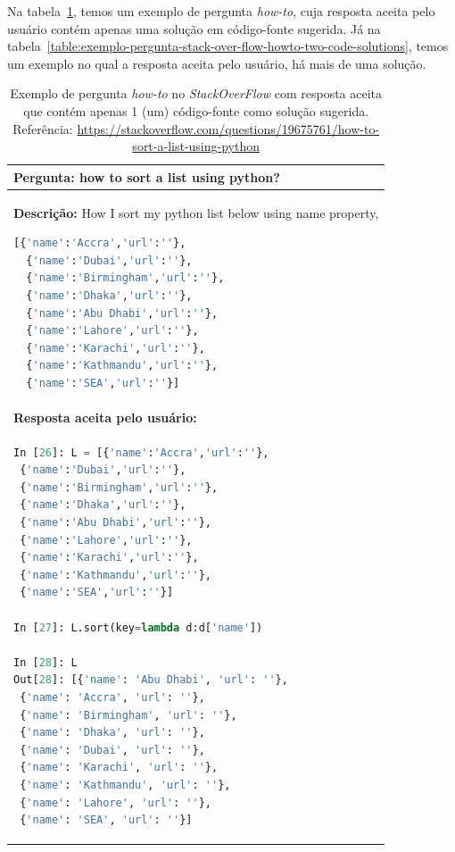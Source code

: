 Na tabela~\ref{table:exemplo-pergunta-stack-over-flow-howto}, temos um exemplo de pergunta \textit{how-to}, cuja resposta aceita pelo usuário contém apenas uma solução em código-fonte sugerida. Já na tabela~\ref{table:exemplo-pergunta-stack-over-flow-howto-two-code-solutions}, temos um exemplo no qual a resposta aceita pelo usuário, há mais de uma solução.



\begin{table}[h!]
\centering
\begin{tabular}{ |p{14cm}| } 
 \hline
 \textbf{Pergunta:} how to sort a list using python? \\ \hline
 \textbf{Descrição:} How I sort my python list below using name property,

\begin{lstlisting}[language=python]
 [{'name':'Accra','url':''},
  {'name':'Dubai','url':''},
  {'name':'Birmingham','url':''},
  {'name':'Dhaka','url':''},
  {'name':'Abu Dhabi','url':''},
  {'name':'Lahore','url':''},
  {'name':'Karachi','url':''},
  {'name':'Kathmandu','url':''},
  {'name':'SEA','url':''}]
\end{lstlisting}
 \\ \hline
 \textbf{Resposta aceita pelo usuário:}\\ 
 \hline
 
 \begin{lstlisting}[language=python]
 In [26]: L = [{'name':'Accra','url':''},
 {'name':'Dubai','url':''},
 {'name':'Birmingham','url':''},
 {'name':'Dhaka','url':''},
 {'name':'Abu Dhabi','url':''},
 {'name':'Lahore','url':''},
 {'name':'Karachi','url':''},
 {'name':'Kathmandu','url':''},
 {'name':'SEA','url':''}]

In [27]: L.sort(key=lambda d:d['name'])

In [28]: L
Out[28]: [{'name': 'Abu Dhabi', 'url': ''},
 {'name': 'Accra', 'url': ''},
 {'name': 'Birmingham', 'url': ''},
 {'name': 'Dhaka', 'url': ''},
 {'name': 'Dubai', 'url': ''},
 {'name': 'Karachi', 'url': ''},
 {'name': 'Kathmandu', 'url': ''},
 {'name': 'Lahore', 'url': ''},
 {'name': 'SEA', 'url': ''}]
\end{lstlisting}
 \\ 
 \hline
\end{tabular}
\caption{Exemplo de pergunta \textit{how-to} no \textit{StackOverFlow} com resposta aceita que contém apenas 1 (um) código-fonte como solução sugerida. Referência: \url{https://stackoverflow.com/questions/19675761/how-to-sort-a-list-using-python}}
\label{table:exemplo-pergunta-stack-over-flow-howto}
\end{table}



